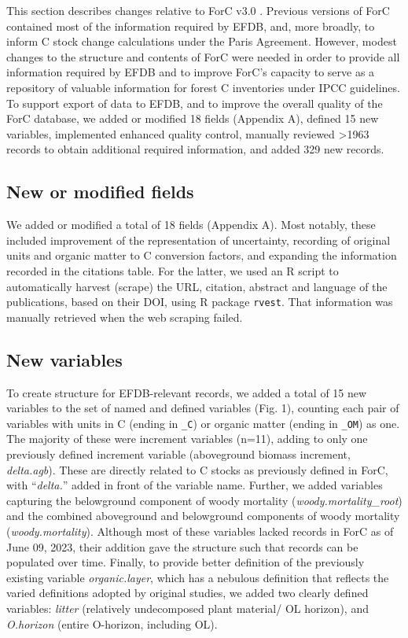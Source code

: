 \documentclass[, manuscript]{copernicus}
\begin{document}
This section describes changes relative to ForC v3.0
\citep{anderson-teixeira_carbon_2021}. Previous versions of ForC
\citep{anderson-teixeira_carbon_2016, anderson-teixeira_forc_2018, anderson-teixeira_carbon_2021}
contained most of the information required by EFDB, and, more broadly,
to inform C stock change calculations under the Paris Agreement.
However, modest changes to the structure and contents of ForC were
needed in order to provide all information required by EFDB and to
improve ForC's capacity to serve as a repository of valuable information
for forest C inventories under IPCC guidelines. To support export of
data to EFDB, and to improve the overall quality of the ForC database,
we added or modified 18 fields (Appendix A), defined 15 new variables,
implemented enhanced quality control, manually reviewed \textgreater1963
records to obtain additional required information, and added 329 new
records.

\subsection{New or modified fields}

We added or modified a total of 18 fields (Appendix A). Most notably,
these included improvement of the representation of uncertainty,
recording of original units and organic matter to C conversion factors,
and expanding the information recorded in the citations table. For the
latter, we used an R script to automatically harvest (scrape) the URL,
citation, abstract and language of the publications, based on their DOI,
using R package \texttt{rvest}\citep{wickham_rvest_2022}. That
information was manually retrieved when the web scraping failed.

\subsection{New variables}

To create structure for EFDB-relevant records, we added a total of 15
new variables to the set of named and defined variables (Fig. 1),
counting each pair of variables with units in C (ending in \texttt{\_C})
or organic matter (ending in \texttt{\_OM}) as one. The majority of
these were increment variables (n=11), adding to only one previously
defined increment variable (aboveground biomass increment,
\emph{delta.agb}). These are directly related to C stocks as previously
defined in ForC, with ``\emph{delta.}'' added in front of the variable
name. Further, we added variables capturing the belowground component of
woody mortality (\emph{woody.mortality\_root}) and the combined
aboveground and belowground components of woody mortality
(\emph{woody.mortality}). Although most of these variables lacked
records in ForC as of June 09, 2023, their addition gave the structure
such that records can be populated over time. Finally, to provide better
definition of the previously existing variable \emph{organic.layer},
which has a nebulous definition that reflects the varied definitions
adopted by original studies, we added two clearly defined variables:
\emph{litter} (relatively undecomposed plant material/ OL horizon), and
\emph{O.horizon} (entire O-horizon, including OL).
\end{document}
